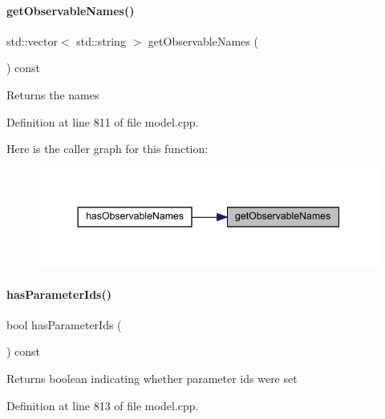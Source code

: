 \paragraph{\texorpdfstring{getObservableNames()}{getObservableNames()}}
{\footnotesize\ttfamily std\+::vector$<$ std\+::string $>$ get\+Observable\+Names (\begin{DoxyParamCaption}{ }\end{DoxyParamCaption}) const\hspace{0.3cm}{\ttfamily [virtual]}}

\begin{DoxyReturn}{Returns}
the names 
\end{DoxyReturn}


Definition at line 811 of file model.\+cpp.

Here is the caller graph for this function\+:
\nopagebreak
\begin{figure}[H]
\begin{center}
\leavevmode
\includegraphics[width=344pt]{classamici_1_1_model_aeac93945b3985b2c3a7c153bdb07679f_icgraph}
\end{center}
\end{figure}
\mbox{\label{classamici_1_1_model_a2bd3836db435507277d0e5c9fa139cb9}} 
\paragraph{\texorpdfstring{hasParameterIds()}{hasParameterIds()}}
{\footnotesize\ttfamily bool has\+Parameter\+Ids (\begin{DoxyParamCaption}{ }\end{DoxyParamCaption}) const\hspace{0.3cm}{\ttfamily [virtual]}}

\begin{DoxyReturn}{Returns}
boolean indicating whether parameter ids were set 
\end{DoxyReturn}


Definition at line 813 of file model.\+cpp.

